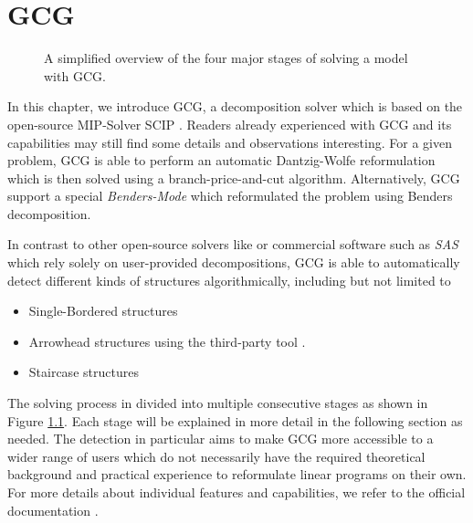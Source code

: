 \chapter{\acf{GCG}}
\label{chap:gcg}

	\begin{figure}[ht!]
		\centering
		
		\caption{A simplified overview of the four major stages of solving a model with \acs{GCG}.}
		\label{fig:gcg:overview}
	\end{figure}

	In this chapter, we introduce \acf{GCG}, a decomposition solver which is based on the open-source MIP-Solver \ac{SCIP} \cite{gamrathExperimentsGenericDantzigWolfe2010}.
	Readers already experienced with GCG and its capabilities may still find some details and observations interesting.
	For a given problem, \acs{GCG} is able to perform an automatic Dantzig-Wolfe reformulation which is then solved using a branch-price-and-cut algorithm.
	Alternatively, \ac{GCG} support a special \textit{Benders-Mode} which reformulated the problem using Benders decomposition.
	
	In contrast to other open-source solvers like  \cite{sadykovBaPCodGenericBranchandprice2021} or commercial software such as \textit{SAS} \cite{SASDataAI} which rely solely on user-provided decompositions, \ac{GCG} is able to automatically detect different kinds of structures algorithmically, including but not limited to
	\begin{itemize}
		\item Single-Bordered structures
		\item Arrowhead structures using the third-party tool  \cite{karypisMultilevelHypergraphPartitioning1997}.
		\item Staircase structures
	\end{itemize}
	
	The solving process in divided into multiple consecutive stages as shown in Figure \ref{fig:gcg:overview}. Each stage will be explained in more detail in the following section as needed.
	The detection in particular aims to make \ac{GCG} more accessible to a wider range of users which do not necessarily have the required theoretical background and practical experience to reformulate linear programs on their own.
	For more details about individual features and capabilities, we refer to the official documentation \cite{GCG}. 

